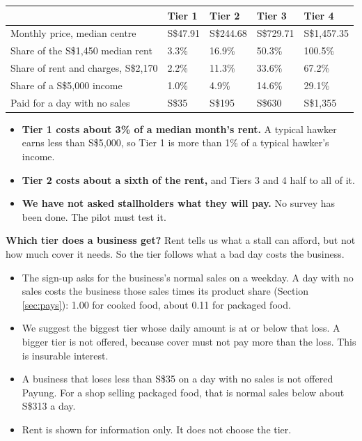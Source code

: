 \documentclass[11pt,a4paper]{article}
\newcommand{\head}{\rowcolor{soft}}
\newcommand{\sgd}{\textup{S\$}}
\begin{document}
\begin{center}
\small
\begin{tabularx}{\textwidth}{|L{5.0cm}|Z|Z|Z|Z|}
\hline
\head & \textbf{Tier 1} & \textbf{Tier 2} & \textbf{Tier 3} & \textbf{Tier 4} \\
\hline
Monthly price, median centre & \sgd 47.91 & \sgd 244.68 & \sgd 729.71 & \sgd 1,457.35 \\
\hline
Share of the \sgd 1,450 median rent & 3.3\% & 16.9\% & 50.3\% & 100.5\% \\
\hline
Share of rent and charges, \sgd 2,170 & 2.2\% & 11.3\% & 33.6\% & 67.2\% \\
\hline
Share of a \sgd 5,000 income & 1.0\% & 4.9\% & 14.6\% & 29.1\% \\
\hline
Paid for a day with no sales & \sgd 35 & \sgd 195 & \sgd 630 & \sgd 1,355 \\
\hline
\end{tabularx}
\end{center}

\begin{itemize}[leftmargin=1.2em]
  \item \textbf{Tier 1 costs about 3\% of a median month's rent.} A typical hawker earns less than \sgd 5,000, so Tier 1 is more than 1\% of a typical hawker's income.
  \item \textbf{Tier 2 costs about a sixth of the rent,} and Tiers 3 and 4 half to all of it.
  \item \textbf{We have not asked stallholders what they will pay.} No survey has been done. The pilot must test it.
\end{itemize}

\textbf{Which tier does a business get?} Rent tells us what a stall can afford, but not how much cover it needs. So the tier follows what a bad day costs the business.
\begin{itemize}[leftmargin=1.2em]
  \item The sign-up asks for the business's normal sales on a weekday. A day with no sales costs the business those sales times its product share (Section \ref{sec:pays}): 1.00 for cooked food, about 0.11 for packaged food.
  \item We suggest the biggest tier whose daily amount is at or below that loss. A bigger tier is not offered, because cover must not pay more than the loss. This is insurable interest.
  \item A business that loses less than \sgd 35 on a day with no sales is not offered Payung. For a shop selling packaged food, that is normal sales below about \sgd 313 a day.
  \item Rent is shown for information only. It does not choose the tier.
\end{itemize}
\end{document}
